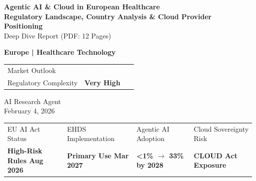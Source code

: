 \documentclass[11pt,a4paper]{article}
\begin{document}
\begin{center}
    {\color{msblue}\LARGE\bfseries Agentic AI \& Cloud in European Healthcare}\\[6pt]
    {\color{msdarkgray}\Large\bfseries Regulatory Landscape, Country Analysis \& Cloud Provider Positioning}\\[3pt]
    {\color{msgray}\small Deep Dive Report (PDF: 12 Pages)}
\end{center}

\vspace{6pt}

\begin{minipage}[t]{0.48\textwidth}
    \textbf{Europe | Healthcare Technology}\\[3pt]
    \begin{tabular}{ll}
        Market Outlook & \colorbox{msgreen}{\textcolor{white}{\textbf{High Growth}}} \\
        Regulatory Complexity & \textbf{Very High} \\
    \end{tabular}
\end{minipage}
\hfill
\begin{minipage}[t]{0.48\textwidth}
    \raggedleft
    \textcolor{msgray}{\small AI Research Agent}\\
    \textcolor{msgray}{\small February 4, 2026}
\end{minipage}

\vspace{10pt}

\begin{tcolorbox}[colback=mslightgray, colframe=mslightgray, boxrule=0pt, arc=3pt, left=6pt, right=6pt, top=5pt, bottom=5pt]
\begin{tabular}{p{3.3cm}p{3.3cm}p{3.3cm}p{3.3cm}}
    \textcolor{msgray}{\scriptsize EU AI Act Status} &
    \textcolor{msgray}{\scriptsize EHDS Implementation} &
    \textcolor{msgray}{\scriptsize Agentic AI Adoption} &
    \textcolor{msgray}{\scriptsize Cloud Sovereignty Risk} \\
    \textbf{High-Risk Rules Aug 2026} &
    \textbf{Primary Use Mar 2027} &
    \textbf{<1\% $\rightarrow$ 33\% by 2028} &
    \textbf{CLOUD Act Exposure} \\
\end{tabular}
\end{tcolorbox}
\end{document}
